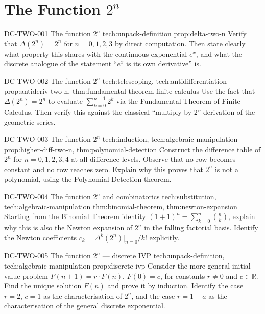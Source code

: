 \section*{\texorpdfstring{The Function \(2^n\)}{The Function 2 to the n}}

\exstubgenfull
  {DC-TWO-001}
  {The function $2^n$}
  {tech:unpack-definition}
  {prop:delta-two-n}
  {Verify that \(\Delta(2^n) = 2^n\) for \(n = 0, 1, 2, 3\) by direct
  computation. Then state clearly what property this shares with the
  continuous exponential \(e^x\), and what the discrete analogue of
  the statement ``\(e^x\) is its own derivative'' is.}

\exstubgenfull
  {DC-TWO-002}
  {The function $2^n$}
  {tech:telescoping, tech:antidifferentiation}
  {prop:antideriv-two-n, thm:fundamental-theorem-finite-calculus}
  {Use the fact that \(\Delta(2^n) = 2^n\) to evaluate
  \(\displaystyle\sum_{k=0}^{n-1} 2^k\) via the Fundamental Theorem
  of Finite Calculus. Then verify this against the classical
  ``multiply by 2'' derivation of the geometric series.}

\exstubgenfull
  {DC-TWO-003}
  {The function $2^n$}
  {tech:induction, tech:algebraic-manipulation}
  {prop:higher-diff-two-n, thm:polynomial-detection}
  {Construct the difference table of \(2^n\) for \(n = 0, 1, 2, 3, 4\)
  at all difference levels. Observe that no row becomes constant and
  no row reaches zero. Explain why this proves that \(2^n\) is not a
  polynomial, using the Polynomial Detection theorem.}

\exstubgenfull
  {DC-TWO-004}
  {The function $2^n$ and combinatorics}
  {tech:substitution, tech:algebraic-manipulation}
  {thm:binomial-theorem, thm:newton-expansion}
  {Starting from the Binomial Theorem identity \((1+1)^n = \sum_{k=0}^{n}\binom{n}{k}\),
  explain why this is also the Newton expansion of \(2^n\) in the
  falling factorial basis. Identify the Newton coefficients
  \(c_k = \Delta^k(2^n)\big|_{n=0}/k!\) explicitly.}

\exstubgenfull
  {DC-TWO-005}
  {The function $2^n$ --- discrete IVP}
  {tech:unpack-definition, tech:algebraic-manipulation}
  {prop:discrete-ivp}
  {Consider the more general initial value problem
  \(F(n+1) = r \cdot F(n)\), \(F(0) = c\), for constants \(r \ne 0\)
  and \(c \in \mathbb{R}\). Find the unique solution \(F(n)\) and
  prove it by induction. Identify the case \(r = 2\), \(c = 1\) as
  the characterisation of \(2^n\), and the case \(r = 1+a\) as the
  characterisation of the general discrete exponential.}
